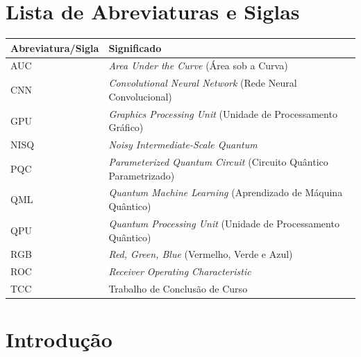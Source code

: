 \documentclass[
    12pt,
    openright,
    oneside,
    a4paper,
    english,
    brazil
]{abntex2}
\begin{document}
\listoffigures*
\cleardoublepage

\listoftables*
\cleardoublepage

\chapter*{Lista de Abreviaturas e Siglas}
\begin{center}
\begin{tabular}{@{}p{3.2cm}p{}@{}}
\toprule
\textbf{Abreviatura/Sigla} & \textbf{Significado} \\
\midrule
AUC & \textit{Area Under the Curve} (Área sob a Curva) \\
CNN & \textit{Convolutional Neural Network} (Rede Neural Convolucional) \\
GPU & \textit{Graphics Processing Unit} (Unidade de Processamento Gráfico) \\
NISQ & \textit{Noisy Intermediate-Scale Quantum} \\
PQC & \textit{Parameterized Quantum Circuit} (Circuito Quântico Parametrizado) \\
QML & \textit{Quantum Machine Learning} (Aprendizado de Máquina Quântico) \\
QPU & \textit{Quantum Processing Unit} (Unidade de Processamento Quântico) \\
RGB & \textit{Red, Green, Blue} (Vermelho, Verde e Azul) \\
ROC & \textit{Receiver Operating Characteristic} \\
TCC & Trabalho de Conclusão de Curso \\
\bottomrule
\end{tabular}
\end{center}
\cleardoublepage

\tableofcontents*
\cleardoublepage

\textual



\chapter{Introdução}
\end{document}
